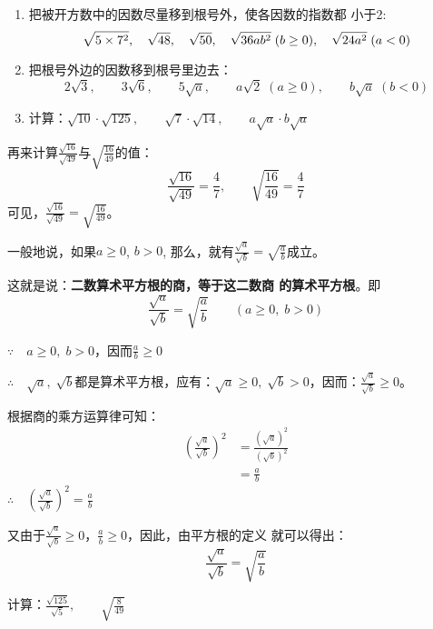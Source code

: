 \begin{ex}
\begin{enumerate}
    \item 把被开方数中的因数尽量移到根号外，使各因数的指数都
    小于2:
 \[   \sqrt{5\times7^2},\quad \sqrt{48},\quad \sqrt{50},\quad \sqrt{36ab^2}\; (b\ge 0),\quad  \sqrt{24a^2}\; (a<0)\]
    \item 把根号外边的因数移到根号里边去：
 \[   2\sqrt{3},\qquad 3\sqrt{6},\qquad 5\sqrt{a},\qquad a\sqrt{2}\;(a\ge 0),\qquad b\sqrt{a}\; (b<0)\]
    \item 计算：$\sqrt{10}\cdot \sqrt{125},\qquad \sqrt{7}\cdot \sqrt{14},\qquad a\sqrt{a}\cdot b\sqrt{a}$
\end{enumerate}
\end{ex}

再来计算$\frac{\sqrt{16}}{\sqrt{49}}$与$\sqrt{\frac{16}{49}}$的值：
\[\frac{\sqrt{16}}{\sqrt{49}}=\frac{4}{7},\qquad \sqrt{\frac{16}{49}}=\frac{4}{7}  \]
可见，$\frac{\sqrt{16}}{\sqrt{49}}=\sqrt{\frac{16}{49}}$。

一般地说，如果$a\ge 0$, $b>0$, 那么，就有$\frac{\sqrt{a}}{\sqrt{b}}=\sqrt{\frac{a}{b}}$成立。

这就是说：\textbf{二数算术平方根的商，等于这二数商
的算术平方根}。即
\[\frac{\sqrt{a}}{\sqrt{b}}=\sqrt{\frac{a}{b}}\qquad (a\ge 0,\; b>0)\]

\begin{note}
    $\because\quad a\ge 0, \; b>0$，因而$\frac{a}{b}\ge 0$

    $\therefore\quad \sqrt{a},\; \sqrt{b}$都是算术平方根，应有：$\sqrt{a}\ge 0,\; \sqrt{b}>0$，因而：$\frac{\sqrt{a}}{\sqrt{b}}\ge 0$。

    根据商的乘方运算律可知：
    \begin{align*}
\left(\frac{\sqrt{a}}{\sqrt{b}}\right)^2&=\frac{(\sqrt{a})^2}{(\sqrt{b})^2}\\
&=\frac{a}{b}\tag{算术平方根的性质}     
    \end{align*}
$\therefore\quad \left(\frac{\sqrt{a}}{\sqrt{b}}\right)^2=\frac{a}{b}$

又由于$\frac{\sqrt{a}}{\sqrt{b}}\ge 0$，$\frac{a}{b}\ge 0$，因此，由平方根的定义
就可以得出：
\[\frac{\sqrt{a}}{\sqrt{b}}=\sqrt{\frac{a}{b}}\]

\end{note}

\begin{example}
    计算：$\frac{\sqrt{125}}{\sqrt{5}},\qquad \sqrt{\frac{8}{49}}$
\end{example}


